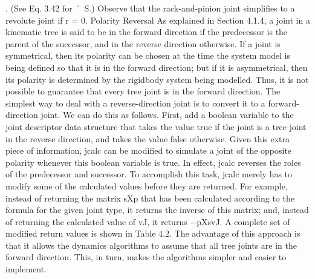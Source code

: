 . (See Eq. 3.42 for ˚ S.) Observe that the rack-and-pinion joint simplifies to a revolute joint if r = 0. Polarity Reversal As explained in Section 4.1.4, a joint in a kinematic tree is said to be in the forward direction if the predecessor is the parent of the successor, and in the reverse direction otherwise. If a joint is symmetrical, then its polarity can be chosen at the time the system model is being defined so that it is in the forward direction; but if it is asymmetrical, then its polarity is determined by the rigidbody system being modelled. Thus, it is not possible to guarantee that every tree joint is in the forward direction. The simplest way to deal with a reverse-direction joint is to convert it to a forward-direction joint. We can do this as follows. First, add a boolean variable to the joint descriptor data structure that takes the value true if the joint is a tree joint in the reverse direction, and takes the value false otherwise. Given this extra piece of information, jcalc can be modified to simulate a joint of the opposite polarity whenever this boolean variable is true. In effect, jcalc reverses the roles of the predecessor and successor. To accomplish this task, jcalc merely has to modify some of the calculated values before they are returned. For example, instead of returning the matrix sXp that has been calculated according to the formula for the given joint type, it returns the inverse of this matrix; and, instead of returning the calculated value of vJ, it returns −pXsvJ. A complete set of modified return values is shown in Table 4.2. The advantage of this approach is that it allows the dynamics algorithms to assume that all tree joints are in the forward direction. This, in turn, makes the algorithms simpler and easier to implement.

